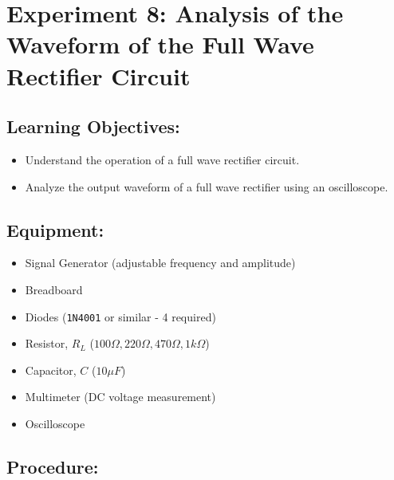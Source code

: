 \section*{Experiment 8: Analysis of the Waveform of the Full Wave Rectifier Circuit}  

\subsection*{Learning Objectives:}
\begin{itemize}
    \item Understand the operation of a full wave rectifier circuit.
    \item Analyze the output waveform of a full wave rectifier using an oscilloscope.
\end{itemize}

\subsection*{Equipment:}
\begin{itemize}
    \item Signal Generator (adjustable frequency and amplitude)
    \item Breadboard
    \item Diodes (\verb|1N4001| or similar - 4 required)
    \item Resistor, $R_L$ ($100\Omega, 220\Omega, 470\Omega, 1k\Omega$)
    \item Capacitor, $C$ ($10 \mu F$)
    \item Multimeter (DC voltage measurement)
    \item Oscilloscope
\end{itemize}

\subsection*{Procedure:}

